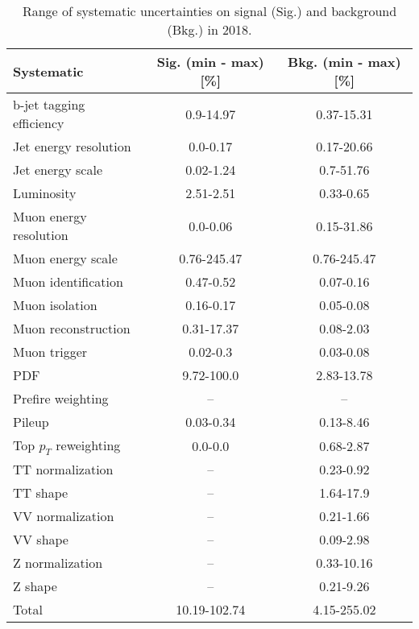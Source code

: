 \begin{table}[htbp]
\begin{center}
\caption{Range of systematic uncertainties on signal (Sig.) and background (Bkg.) in 2018.}
\begin{tabular}{lcc}
\hline\hline
Systematic				&  Sig. (min - max) [\%] &  Bkg. (min - max) [\%]  \\ \hline
b-jet tagging efficiency	& 0.9-14.97 & 0.37-15.31 \\
Jet energy resolution  	& 0.0-0.17 & 0.17-20.66 \\
Jet energy scale       	& 0.02-1.24 & 0.7-51.76 \\
Luminosity		 		& 2.51-2.51 & 0.33-0.65 \\
Muon energy resolution 	& 0.0-0.06 & 0.15-31.86 \\
Muon energy scale			& 0.76-245.47 & 0.76-245.47 \\
Muon identification		& 0.47-0.52 & 0.07-0.16 \\
Muon isolation			& 0.16-0.17 & 0.05-0.08 \\
Muon reconstruction		& 0.31-17.37 & 0.08-2.03 \\
Muon trigger				& 0.02-0.3 & 0.03-0.08 \\
PDF                    	& 9.72-100.0 & 2.83-13.78 \\
Prefire weighting			& -- & -- \\
Pileup                	& 0.03-0.34 & 0.13-8.46 \\
Top $p_T$ reweighting     & 0.0-0.0 & 0.68-2.87 \\
TT normalization       	& -- & 0.23-0.92 \\
TT shape               	& -- & 1.64-17.9 \\
VV normalization      	& -- & 0.21-1.66 \\
VV shape          		& -- & 0.09-2.98 \\
Z normalization        	& -- & 0.33-10.16 \\
Z shape                	& -- & 0.21-9.26 \\
Total                 	& 10.19-102.74 & 4.15-255.02 \\ \hline\hline
\end{tabular}
\label{tab:SysRanges2018}
\end{center}
\end{table}

